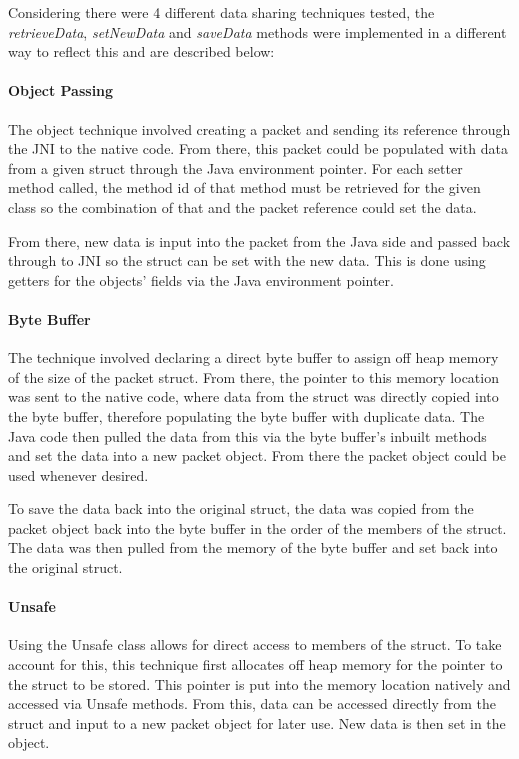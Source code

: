 \documentclass[final_report.tex]{subfiles}
\begin{document}
Considering there were 4 different data sharing techniques tested, the \textit{retrieveData}, \textit{setNewData} and \textit{saveData} methods were implemented in a different way to reflect this and are described below:

\paragraph*{Object Passing}
The object technique involved creating a packet and sending its reference through the JNI to the native code. From there, this packet could be populated with data from a given struct through the Java environment pointer. For each setter method called, the method id of that method must be retrieved for the given class so the combination of that and the packet reference could set the data.

From there, new data is input into the packet from the Java side and passed back through to JNI so the struct can be set with the new data. This is done using getters for the objects' fields via the Java environment pointer.

\paragraph*{Byte Buffer}
The technique involved declaring a direct byte buffer to assign off heap memory of the size of the packet struct. From there, the pointer to this memory location was sent to the native code, where data from the struct was directly copied into the byte buffer, therefore populating the byte buffer with duplicate data. The Java code then pulled the data from this via the byte buffer's inbuilt methods and set the data into a new packet object. From there the packet object could be used whenever desired.

To save the data back into the original struct, the data was copied from the packet object back into the byte buffer in the order of the members of the struct. The data was then pulled from the memory of the byte buffer and set back into the original struct.

\paragraph*{Unsafe}
Using the Unsafe class allows for direct access to members of the struct. To take account for this, this technique first allocates off heap memory for the pointer to the struct to be stored. This pointer is put into the memory location natively and accessed via Unsafe methods. From this, data can be accessed directly from the struct and input to a new packet object for later use. New data is then set in the object.
\end{document}
